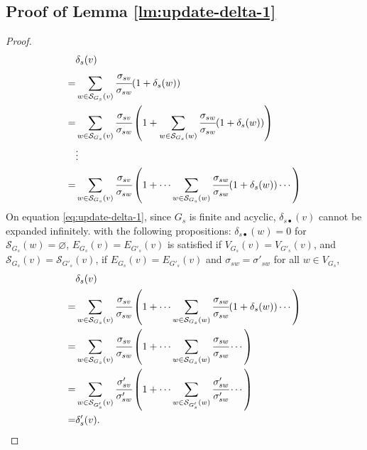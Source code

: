 \subsection{Proof of Lemma \ref{lm:update-delta-1}}
\begin{proof}
  \begin{align}
    &\delta_s(v)\nonumber\\
    =&\sum_{w\in\mathcal{S}_{G_s}(v)}\cfrac{\sigma_{sv}}{\sigma_{sw}}(1+\delta_s(w)) \nonumber\\
    =&\sum_{w\in\mathcal{S}_{G_s}(v)}\cfrac{\sigma_{sv}}{\sigma_{sw}}\left(1+
    \sum_{w\in\mathcal{S}_{G_s}(w)}\cfrac{\sigma_{sw}}{\sigma_{sw}}(1+\delta_s(w))
    \right) \nonumber\\
    &\vdots \nonumber\\
    =&\sum_{w\in\mathcal{S}_{G_s}(v)}\cfrac{\sigma_{sv}}{\sigma_{sw}}\left(1+\cdots
    \sum_{w\in\mathcal{S}_{G_s}(w)}\cfrac{\sigma_{sw}}{\sigma_{sw}}(1+\delta_s(w))
    \cdots\right)
    \label{eq:update-delta-1}
  \end{align}
  On equation \eqref{eq:update-delta-1}, since $G_s$ is finite and acyclic,
  $\delta_{s\bullet}(v)$ cannot be expanded infinitely.
  with the following propositions: $\delta_{s\bullet}(w)=0$ for $\mathcal{S}_{G_s}(w)=\varnothing$,
  $E_{G_s}(v)=E_{G'_s}(v)$ is satisfied if $V_{G_s}(v)=V_{G'_s}(v)$, and
  $\mathcal{S}_{G_s}(v)=\mathcal{S}_{G'_s}(v)$,
  if $E_{G_s}(v)=E_{G'_s}(v)$ and $\sigma_{sw}=\sigma'_{sw}$ for all $w\in V_{G_s}$,
  \begin{equation*}
    \begin{aligned}
      &\delta_s(v) \\
      =&\sum_{w\in\mathcal{S}_{G_s}(v)}\cfrac{\sigma_{sv}}{\sigma_{sw}}\left(1+\cdots
      \sum_{w\in\mathcal{S}_{G_s}(w)}\cfrac{\sigma_{sw}}{\sigma_{sw}}(1+\delta_s(w))
      \cdots\right) \\
      =&\sum_{w\in\mathcal{S}_{G_s}(v)}\cfrac{\sigma_{sv}}{\sigma_{sw}}\left(1+\cdots
      \sum_{w\in\mathcal{S}_{G_s}(w)}\cfrac{\sigma_{sw}}{\sigma_{sw}}
      \cdots\right) \\
      =&\sum_{w\in\mathcal{S}_{G'_s}(v)}\cfrac{\sigma'_{sv}}{\sigma'_{sw}}\left(1+\cdots
      \sum_{w\in\mathcal{S}_{G'_s}(w)}\cfrac{\sigma'_{sw}}{\sigma'_{sw}}
      \cdots\right) \\
      =&\delta'_s(v).
    \end{aligned}
  \end{equation*}
\end{proof}

